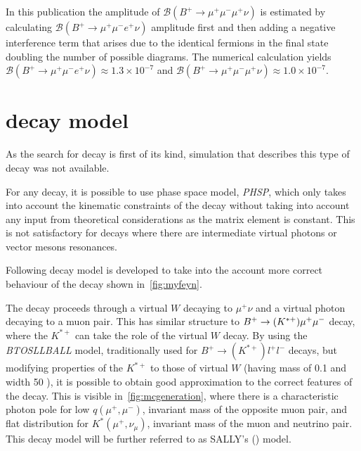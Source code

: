 In this publication the amplitude of $\mathcal{B}(B^{+}\rightarrow \mu^{+} \mu^{-} \mu^{+} \nu)$ is estimated by calculating $\mathcal{B}(B^{+}\rightarrow \mu^{+} \mu^{-} e^{+} \nu)$ amplitude first and then adding a negative interference term that arises due to the identical fermions in the final state doubling the number of possible diagrams. The numerical calculation yields $\mathcal{B}(B^{+}\rightarrow \mu^{+} \mu^{-} e^{+} \nu) \approx 1.3 \times 10^{-7}$ and $\mathcal{B}(B^{+}\rightarrow \mu^{+} \mu^{-} \mu^{+} \nu) \approx 1.0 \times 10^{-7}$. 

\section{\mb{\Bmumumu} decay model}
\label{simulation}
As the search for \Bmumumu decay is first of its kind, simulation that describes this type of decay was not available. 

For any decay, it is possible to use phase space model, \textit{PHSP}, which only takes into account the kinematic constraints of the decay without taking into account any input from theoretical considerations as the matrix element is constant. This is not satisfactory for decays where there are intermediate virtual photons or vector mesons resonances.

Following decay model is developed to take into the account more correct behaviour of the decay shown in~\autoref{fig:myfeyn}.

The decay proceeds through a virtual $W$ decaying to $\mu^{+} \nu$ and a virtual photon decaying to a muon pair. This has similar structure to ${B}^{+} \rightarrow (K^{*+}) \mu^{+} \mu^{-}$ decay, where the $K^{*+}$ can take the role of the virtual $W$ decay. By using the \textit{BTOSLLBALL} model\cite{Ali:1999mm}, traditionally used for $B^{+} \rightarrow (K^{*+}) l^{+} l^{-}$ decays, but modifying properties of the $K^{*+}$ to those of virtual $W$ (having mass of 0.1 \gevcc and width 50 \gev), it is possible to obtain good approximation to the correct features of the decay. This is visible in~\autoref{fig:mcgeneration}, where there is a characteristic photon pole for low $q(\mu^{+},\mu^{-})$, invariant mass of the opposite muon pair, and flat distribution for $K^{*}(\mu^{+}, \nu_{\mu}) $, invariant mass of the muon and neutrino pair. This decay model will be further referred to as SALLY's () model. 



